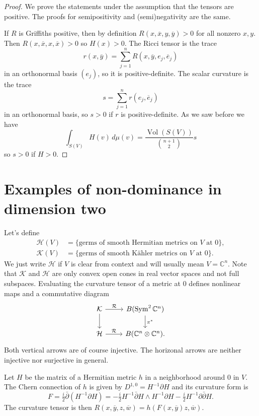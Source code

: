\documentclass[10pt,a4paper]{amsart}
\theoremstyle{definition}
\def\ov#1{\overline{#1}}
\newcommand{\kk}[1]{\mathbb{#1}}
\newcommand{\cc}[1]{\mathcal{#1}}
\DeclareMathOperator{\Vol}{Vol}
\begin{document}
\begin{proof}
We prove the statements under the assumption that the tensors are positive.
The proofs for semipositivity and (semi)negativity are the same.

If $R$ is Griffiths positive, then by definition $R(x, \ov x, y, \ov y) > 0$
for all nonzero $x, y$. Then $R(x, \ov x, x, \ov x) > 0$ so $H(x) > 0$.
The Ricci tensor is the trace
$$
r(x, \ov y) = \sum_{j = 1}^n R(x, \ov y, e_j, \ov e_j)
$$
in an orthonormal basis $(e_j)$, so it is positive-definite.
The scalar curvature is the trace
$$
s = \sum_{j=1}^n r(e_j, \ov e_j)
$$
in an orthonormal basis, so $s > 0$ if $r$ is positive-definite.
As we saw before we have
\[
\int_{S(V)} H(v) \, d\mu(v)
= \frac{\Vol(S(V))}{\binom{n+1}{2}} s
\]
so $s > 0$ if $H > 0$.
\end{proof}



\section{Examples of non-dominance in dimension two}

Let's define
\begin{align*}
\cc H(V)
&= \{ \text{germs of smooth Hermitian metrics on $V$ at $0$} \},
\\
\cc K(V)
&= \{ \text{germs of smooth K\"ahler metrics on $V$ at $0$} \}.
\end{align*}
We just write $\cc H$ if $V$ is clear from context and will usually mean $V =
\kk C^n$. Note that $\cc K$ and $\cc H$ are only convex open cones in real
vector spaces and not full subspaces.
Evaluating the curvature tensor of a metric at $0$ defines nonlinear maps and a
commutative diagram
$$
\begin{tikzcd}
\cc K \ar[d] \ar[r,"\cc R"] & B(\operatorname{Sym}^2 \kk C^n)\ar[d,"\pi^*"]
\\
\cc H \ar[r, "\cc R"] & B(\kk C^n \otimes \kk C^n).
\end{tikzcd}
$$
Both vertical arrows are of course injective.
The horizonal arrows are neither injective nor surjective in general.


Let $H$ be the matrix of a Hermitian metric $h$ in a neighborhood around $0$ in
$V$. The Chern connection of $h$ is given by $D^{1,0} = H^{-1}\partial H$ and its
curvature form is
$$
F = \tfrac i2 \bar\partial(H^{-1}\partial H)
= - \tfrac i2 H^{-1} \bar\partial H \wedge H^{-1} \partial H
- \tfrac i2 H^{-1} \partial \bar\partial H.
$$
The curvature tensor is then $R(x,\ov y, z, \ov w) = h(F(x, \ov y) z, \ov w)$.
\end{document}
